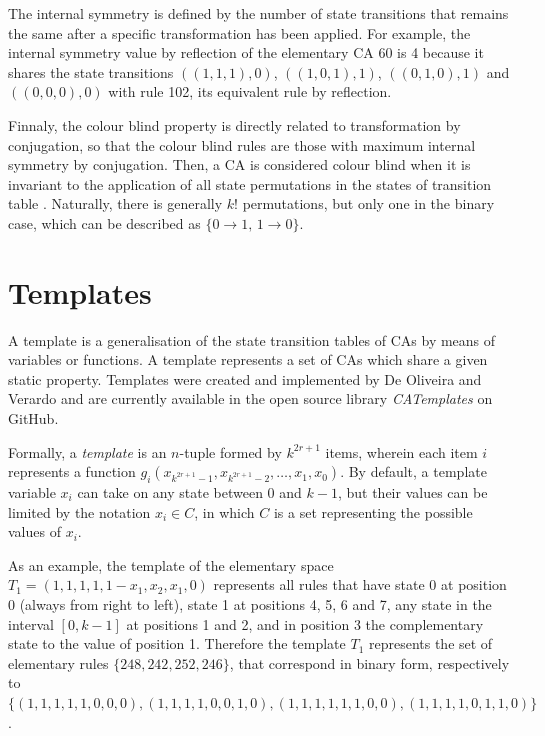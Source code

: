 \documentclass{llncs}
\begin{document}
The internal symmetry is defined by the number of state transitions that remains the same after a specific transformation has been applied. For example, the internal symmetry value by reflection of the elementary CA 60 is 4 because it shares the state transitions $((1,1,1),0)$, $((1,0,1),1)$, $((0,1,0),1)$ and $ ((0,0,0),0)$ with rule 102, its equivalent rule by reflection.

Finnaly, the colour blind property is directly related to transformation by conjugation, so that the colour blind rules are those with maximum internal symmetry by conjugation. Then, a CA is considered colour blind when it is invariant to the application of all state permutations in the states of transition table \cite{salo2013color}. Naturally, there is generally $k!$ permutations, but only one in the binary case, which can be described as $\{0 \to 1 ,\, 1 \to 0\}$.

\section{Templates}
\label{sec:templates}
A template is a generalisation of the state transition tables of CAs by means of variables or functions. A template represents a set of CAs which share a given static property. Templates were created and implemented by De Oliveira and Verardo \cite{deOliveira2014,deOliveira2014b} and are currently available in the open source library \textit{CATemplates} \cite{CATemplates} on GitHub.

Formally, a \textit{template} is an $n$-tuple formed by $k^{2r+1}$ items, wherein each item $i$ represents a function $g_i(x_{k^{2r+1}-1},x_{k^{2r+1}-2},\dots,x_1,x_0)$. By default, a template variable $x_i$ can take on any state between 0 and $k-1$, but their values can be limited by the notation $x_i \in C$, in which $C$ is a set representing the possible values of $x_i$. %

As an example, the template of the elementary space $T_1 = (1,1,1,1,1-x_1,x_2,x_1,0)$ represents all rules that have state 0 at position 0 (always from right to left), state 1 at positions 4, 5, 6 and 7, any state in the interval $[0, k-1]$ at positions 1 and 2, and in position 3 the complementary state to the value of position 1. Therefore the template $T_1$ represents the set of elementary rules $\{248,242,252,246\}$, that correspond in binary form, respectively to $\{(1,1,1,1,1,0,0,0), (1,1,1,1,0,0,1,0), (1,1,1,1,1,1,0,0), (1,1,1,1,0,1,1,0)\}$.
\end{document}
